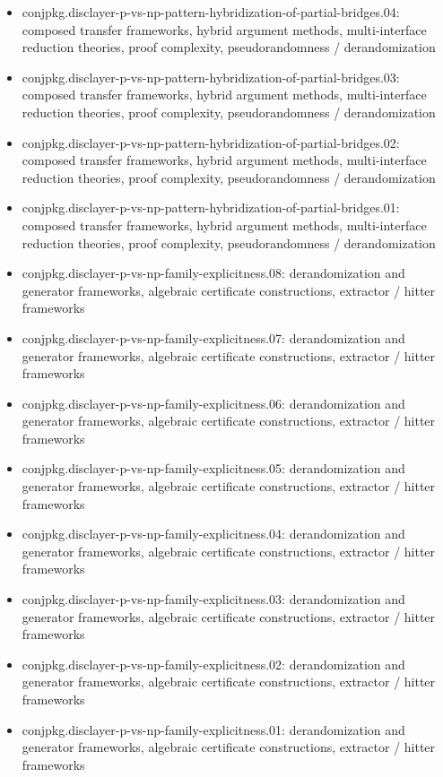 \documentclass[11pt]{article}
\begin{document}
\begin{itemize}
\item conjpkg.disclayer-p-vs-np-pattern-hybridization-of-partial-bridges.04: composed transfer frameworks, hybrid argument methods, multi-interface reduction theories, proof complexity, pseudorandomness / derandomization
\item conjpkg.disclayer-p-vs-np-pattern-hybridization-of-partial-bridges.03: composed transfer frameworks, hybrid argument methods, multi-interface reduction theories, proof complexity, pseudorandomness / derandomization
\item conjpkg.disclayer-p-vs-np-pattern-hybridization-of-partial-bridges.02: composed transfer frameworks, hybrid argument methods, multi-interface reduction theories, proof complexity, pseudorandomness / derandomization
\item conjpkg.disclayer-p-vs-np-pattern-hybridization-of-partial-bridges.01: composed transfer frameworks, hybrid argument methods, multi-interface reduction theories, proof complexity, pseudorandomness / derandomization
\item conjpkg.disclayer-p-vs-np-family-explicitness.08: derandomization and generator frameworks, algebraic certificate constructions, extractor / hitter frameworks
\item conjpkg.disclayer-p-vs-np-family-explicitness.07: derandomization and generator frameworks, algebraic certificate constructions, extractor / hitter frameworks
\item conjpkg.disclayer-p-vs-np-family-explicitness.06: derandomization and generator frameworks, algebraic certificate constructions, extractor / hitter frameworks
\item conjpkg.disclayer-p-vs-np-family-explicitness.05: derandomization and generator frameworks, algebraic certificate constructions, extractor / hitter frameworks
\item conjpkg.disclayer-p-vs-np-family-explicitness.04: derandomization and generator frameworks, algebraic certificate constructions, extractor / hitter frameworks
\item conjpkg.disclayer-p-vs-np-family-explicitness.03: derandomization and generator frameworks, algebraic certificate constructions, extractor / hitter frameworks
\item conjpkg.disclayer-p-vs-np-family-explicitness.02: derandomization and generator frameworks, algebraic certificate constructions, extractor / hitter frameworks
\item conjpkg.disclayer-p-vs-np-family-explicitness.01: derandomization and generator frameworks, algebraic certificate constructions, extractor / hitter frameworks

\end{itemize}
\end{document}
